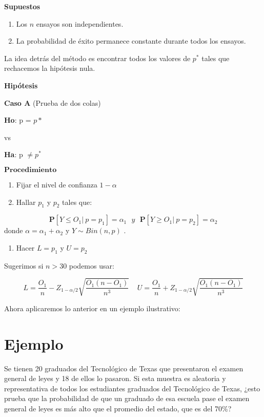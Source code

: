 \documentclass[a4paper,oneside,openany]{book}
\providecommand{\tightlist}{%
  \setlength{\itemsep}{0pt}\setlength{\parskip}{0pt}}
\begin{document}
\textbf{Supuestos}

\begin{enumerate}
\def\labelenumi{\arabic{enumi})}
\item
  Los \(n\) ensayos son independientes.
\item
  La probabilidad de éxito permanece constante durante todos los
  ensayos.
\end{enumerate}

La idea detrás del método es encontrar todos los valores de \(p^*\)
tales que rechacemos la hipótesis nula.

\textbf{Hipótesis}

\textbf{Caso A} (Prueba de dos colas)

\textbf{Ho}: p = \(p*\)

vs

\textbf{Ha}: p \(\neq p^*\)

\(\mathbf{Procedimiento}\)

\begin{enumerate}
\def\labelenumi{\arabic{enumi})}
\item
  Fijar el nivel de confianza \(1-\alpha\)
\item
  Hallar \(p_{1}\) y \(p_{2}\) tales que:
\end{enumerate}

\[\mathbf{P}[Y\leq O_{1}| \ p=p_{1}]= \alpha_{1} \ \ \ y \ \ \ \mathbf{P}[Y\geq O_{1}| \ p=p_{2}]= \alpha_{2} \]
donde \(\alpha=\alpha_{1}+\alpha_{2}\) y \(Y \sim Bin (n,p)\) .

\begin{enumerate}
\def\labelenumi{\arabic{enumi})}
\setcounter{enumi}{2}
\tightlist
\item
  Hacer \(L= p_{1}\) y \(U=p_{2}\)
\end{enumerate}

Sugerimos si \(n>30\) podemos usar:

\[L=\frac{O_{1}}{n}-Z_{1-\alpha/2}\sqrt{\frac{O_{1}(n-O_{1})}{n^3}} \ \ \ \ \  U=\frac{O_{1}}{n}+Z_{1-\alpha/2}\sqrt{\frac{O_{1}(n-O_{1})}{n^3}}\]

Ahora aplicaremos lo anterior en un ejemplo ilustrativo:

\section{Ejemplo}\label{ejemplo}

Se tienen 20 graduados del Tecnológico de Texas que presentaron el
examen general de leyes y 18 de ellos lo pasaron. Si esta muestra es
aleatoria y representativa de todos los estudiantes graduados del
Tecnológico de Texas, ¿esto prueba que la probabilidad de que un
graduado de esa escuela pase el examen general de leyes es más alto que
el promedio del estado, que es del 70\%?
\end{document}
